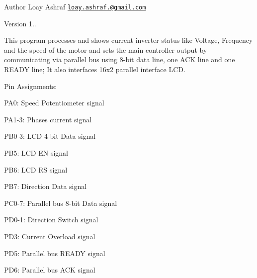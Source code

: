 \begin{DoxyAuthor}{Author}
Loay Ashraf \href{mailto:loay.ashraf.96@gmail.com}{\tt loay.\+ashraf.@gmail.\+com} 
\end{DoxyAuthor}
\begin{DoxyVersion}{Version}
1..
\end{DoxyVersion}
This program processes and shows current inverter status like Voltage, Frequency and the speed of the motor and sets the main controller output by communicating via parallel bus using 8-\/bit data line, one A\+CK line and one R\+E\+A\+DY line; It also interfaces 16x2 parallel interface L\+CD.

\begin{DoxyParagraph}{Pin Assignments\+: }

\begin{DoxyItemize}
\item P\+A0\+: Speed Potentiometer signal
\item P\+A1-\/3\+: Phases current signal
\item P\+B0-\/3\+: L\+CD 4-\/bit Data signal
\item P\+B5\+: L\+CD EN signal
\item P\+B6\+: L\+CD RS signal
\item P\+B7\+: Direction Data signal
\item P\+C0-\/7\+: Parallel bus 8-\/bit Data signal
\item P\+D0-\/1\+: Direction Switch signal
\item P\+D3\+: Current Overload signal
\item P\+D5\+: Parallel bus R\+E\+A\+DY signal
\item P\+D6\+: Parallel bus A\+CK signal 
\end{DoxyItemize}
\end{DoxyParagraph}
